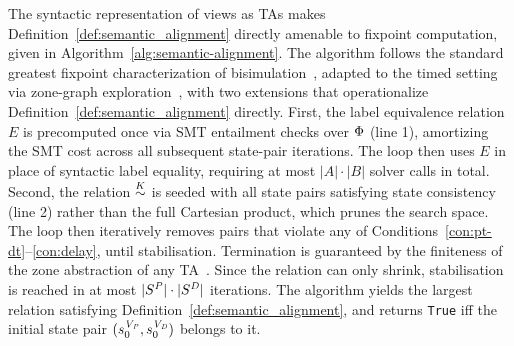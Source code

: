 The syntactic representation of views as TAs makes Definition~\ref{def:semantic_alignment} directly amenable to fixpoint computation, given in Algorithm~\ref{alg:semantic-alignment}. The algorithm follows the standard greatest fixpoint characterization of bisimulation~\cite{Baier08}, adapted to the timed setting via zone-graph exploration~\cite{ALUR19932, Bouyer2005AnIT}, with two extensions that operationalize Definition~\ref{def:semantic_alignment} directly. First, the label equivalence relation $E$ is precomputed once via SMT entailment checks over $\Phi$ (line 1), amortizing the SMT cost across all subsequent state-pair iterations. The loop then uses $E$ in place of syntactic label equality, requiring at most $|A| \cdot |B|$ solver calls in total. Second, the relation $\stackrel{K}{\sim}$ is seeded with all state pairs satisfying state consistency (line 2) rather than the full Cartesian product, which prunes the search space. The loop then iteratively removes pairs that violate any of Conditions~\ref{con:pt-dt}--\ref{con:delay}, until stabilisation. Termination is guaranteed by the finiteness of the zone abstraction of any TA~\cite{ALUR19932, Bouyer2005AnIT}. Since the relation can only shrink, stabilisation is reached in at most $|S^{\mathit{P}}| \cdot |S^{\mathit{D}}|$ iterations. The algorithm yields the largest relation satisfying Definition~\ref{def:semantic_alignment}, and returns \texttt{True} iff the initial state pair $(s^{\mathit{V_P}}_0, s^{\mathit{V_D}}_0)$ belongs to it.




%




